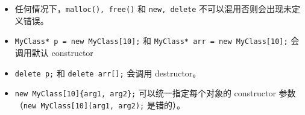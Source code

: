 
\begin{itemize}
\item 任何情况下，\verb`malloc(), free()` 和 \verb`new, delete` 不可以混用否则会出现未定义错误。
\item \verb`MyClass* p = new MyClass[10];` 和 \verb`MyClass* arr = new MyClass[10];` 会调用默认 constructor
\item \verb`delete p;` 和 \verb`delete arr[];` 会调用 destructor。
\item \verb`new MyClass[10]{arg1, arg2};` 可以统一指定每个对象的 constructor 参数（\verb`new MyClass[10](arg1, arg2);` 是错的）。
\end{itemize}
